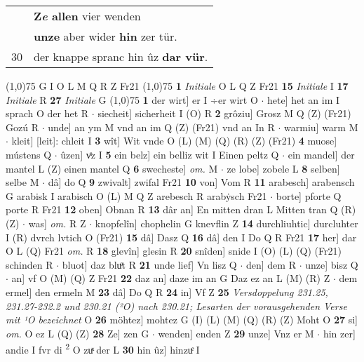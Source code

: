 \documentclass[8pt,a4paper,notitlepage]{article}
\begin{document}
\begin{table}[ht]
\begin{minipage}[t]{0.5\linewidth}
\begin{tabular}{rl}
 & \textbf{Z\textit{e} allen} vier wenden\\ 
 & \textbf{unze} aber wider \textbf{hin} zer tür.\\ 
30 & der knappe spranc hin ûz \textbf{dar vür}.\\ 
\end{tabular}
\scriptsize
\line(1,0){75} \newline
G I O L M Q R Z Fr21 \newline
\line(1,0){75} \newline
\textbf{1} \textit{Initiale} O L Q Z Fr21  \textbf{15} \textit{Initiale} I  \textbf{17} \textit{Initiale} R  \textbf{27} \textit{Initiale} G  \newline
\line(1,0){75} \newline
\textbf{1} der wirt] er I ÷er wirt O  $\cdot$ hete] het an im I sprach O der het R  $\cdot$ siecheit] sicherheit I (O) R \textbf{2} grôziu] Grosz M Q (Z) (Fr21) Gozú R  $\cdot$ unde] an ym M vnd an im Q (Z) (Fr21) vnd an In R  $\cdot$ warmiu] warm M  $\cdot$ kleit] [leit]: chleit I \textbf{3} wît] Wit vnde O (L) (M) (Q) (R) (Z) (Fr21) \textbf{4} muose] mústens Q  $\cdot$ ûzen] vͤz I \textbf{5} ein belz] ein belliz wit I Einen peltz Q  $\cdot$ ein mandel] der mantel L (Z) einen mantel Q \textbf{6} swecheste] \textit{om.} M  $\cdot$ ze lobe] zobele L \textbf{8} selben] selbe M  $\cdot$ dâ] do Q \textbf{9} zwivalt] zwifal Fr21 \textbf{10} von] Vom R \textbf{11} arabesch] arabensch G arabisk I arabisch O (L) M Q Z arebesch R arabẏsch Fr21  $\cdot$ borte] pforte Q porte R Fr21 \textbf{12} oben] Obnan R \textbf{13} dâr an] En mitten dran L Mitten tran Q (R) (Z)  $\cdot$ was] \textit{om.} R Z  $\cdot$ knopfelîn] chophelin G knevflin Z \textbf{14} durchliuhtic] durcluhter I (R) dvrch lvtich O (Fr21) \textbf{15} dâ] Dasz Q \textbf{16} dâ] den I Do Q R Fr21 \textbf{17} her] dar O L (Q) Fr21 \textit{om.} R \textbf{18} glevîn] glesin R \textbf{20} snîden] snide I (O) (L) (Q) (Fr21) schinden R  $\cdot$ bluot] daz bluͦt R \textbf{21} unde lief] Vn lisz Q  $\cdot$ den] dem R  $\cdot$ unze] bisz Q  $\cdot$ an] vf O (M) (Q) Z Fr21 \textbf{22} daz an] daze im an G Daz ez an L (M) (R) Z  $\cdot$ dem ermel] den ermeln M \textbf{23} dâ] Do Q R \textbf{24} in] Vf Z \textbf{25} \textit{Versdoppelung 231.25, 231.27-232.2 und 230.21 (²O) nach 230.21; Lesarten der vorausgehenden Verse mit ¹O bezeichnet} O  \textbf{26} möhtez] mohtez G (I) (L) (M) (Q) (R) (Z) Moht O \textbf{27} si] \textit{om.} O ez L (Q) (Z) \textbf{28} Ze] zen G  $\cdot$ wenden] enden Z \textbf{29} unze] Vnz er M  $\cdot$ hin zer] andie I fvr di \textsuperscript{2}\hspace{-1.3mm} O zuͯ der L \textbf{30} hin ûz] hinzuͤ I \newline

\end{minipage}
\end{table}
\end{document}
